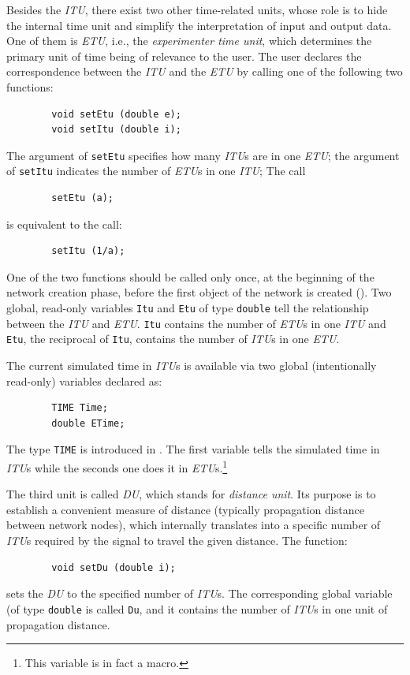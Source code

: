 Besides the {\em ITU}, there exist two other time-related units, whose role
is to hide the internal time unit and simplify the interpretation of input
and output data.
One of them is {\em ETU}, i.e., the
{\em experimenter time unit}, which determines the primary unit of time being of
relevance to the user.
The user declares the correspondence between the {\em ITU\/} and the {\em ETU\/}
by calling one of the following two functions:
\begin{verbatim}
        void setEtu (double e);
        void setItu (double i);
\end{verbatim}
The argument of {\tt setEtu}
specifies how many {\em ITU\/}s are in one {\em ETU};
the argument of {\tt setItu}
indicates the number of {\em ETU\/}s in one {\em ITU};
The call
\begin{verbatim}
        setEtu (a);
\end{verbatim}
is equivalent to the call:
\begin{verbatim}
        setItu (1/a);
\end{verbatim}
One of the two functions
should be called only once, at the beginning of the network
creation phase, before the first object of the network is created
().
Two global, read-only variables {\tt Itu} and {\tt Etu} of type {\tt double}
tell the relationship between the {\em ITU\/} and {\em ETU}.
{\tt Itu} contains the number of {\em ETU\/}s in one {\em ITU\/} and
{\tt Etu}, the reciprocal of {\tt Itu}, contains the number of {\em ITU\/}s
in one {\em ETU}.

The current simulated time in {\em ITU\/}s is available via two global (intentionally read-only) variables declared as:
\begin{verbatim}
        TIME Time;
        double ETime;
\end{verbatim}
\noindent
The type {\tt TIME} is introduced in .
The first variable tells the simulated time in {\em ITU\/}s while the seconds one does it in {\em ETU\/}s.\footnote{This variable is in fact a macro.}

The third unit is called {\em DU}, which stands for {\em distance unit}.
Its purpose is to establish a convenient measure of distance (typically
propagation distance between network nodes), which internally translates into
a specific number of {\em ITU\/}s required by the signal to travel the given
distance.
The function:
\begin{verbatim}
        void setDu (double i);
\end{verbatim}
sets the {\em DU\/} to the specified number of {\em ITU\/}s.
The corresponding global variable (of type {\tt double} is called {\tt Du},
and it contains the number of {\em ITU\/}s in one unit of propagation
distance.

